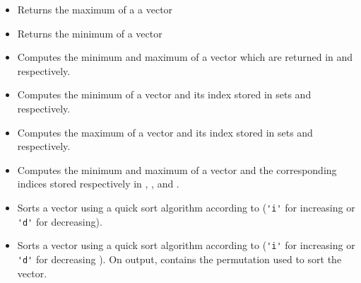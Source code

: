 \begin{itemize}
\item {}
  \sshortdescribe Returns the maximum of a a vector  

\item {}
  \sshortdescribe Returns the minimum of a vector  

\item {}
  \sshortdescribe Computes the minimum and maximum of a vector which are
  returned in   and  respectively.
  
\item {}
  \sshortdescribe Computes the minimum of a vector and its index stored in 
  sets  and  respectively.

\item {}
  \sshortdescribe Computes the maximum of a vector and its index stored in 
  sets  and  respectively.

\item {}
  \sshortdescribe Computes the minimum and maximum of a vector and the
  corresponding indices stored respectively in , ,  and
  .

\item {}
  \sshortdescribe Sorts a vector using a quick sort algorithm according to
   (\verb!'i'! for increasing or \verb!'d'! for decreasing).

\item {}
  \sshortdescribe Sorts a vector using a quick sort algorithm according to
   (\verb!'i'! for increasing or \verb!'d'! for decreasing ). On
  output,  contains the permutation used to sort the vector.


\end{itemize}
